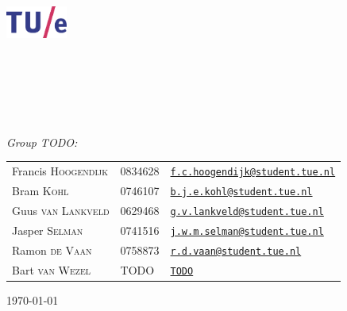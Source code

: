 \begin{titlepage}
	\begin{center}

		\includegraphics[width=0.15\textwidth]{Images/tuelogo}\\[1cm]

		\textsc{\LARGE \uni}\\[0.2cm]

		\textsc{\fase}\\[1.6cm]

        \textsc{\LARGE \vak}\\[0.5cm]

\HRule \\[0.4cm]
{ \huge \bfseries \essaytitle}\\[0.4cm]

\HRule \\[1.5cm]

	\emph{Group TODO:}\\
    \begin{tabular}{l l l}
	Francis \textsc{Hoogendijk} & 0834628 & \href{mailto:f.c.hoogendijk@student.tue.nl}{\texttt{f.c.hoogendijk@student.tue.nl}}\\
	Bram \textsc{Kohl} & 0746107 & \href{mailto:b.j.e.kohl@student.tue.nl}{\texttt{b.j.e.kohl@student.tue.nl}}\\
	Guus \textsc{van Lankveld} & 0629468 & \href{mailto:g.v.lankveld@student.tue.nl}{\texttt{g.v.lankveld@student.tue.nl}}\\
	Jasper \textsc{Selman} & 0741516 & \href{mailto:j.w.m.selman@student.tue.nl}{\texttt{j.w.m.selman@student.tue.nl}}\\
	Ramon \textsc{de Vaan} & 0758873 & \href{mailto:r.d.vaan@student.tue.nl}{\texttt{r.d.vaan@student.tue.nl}}\\
	Bart \textsc{van Wezel} & TODO & \href{mailto:r.d.vaan@student.tue.nl}{\texttt{TODO}}
    \end{tabular}
		\vfill

		{\large \today} \\
		\stad

	\end{center}
\end{titlepage} 